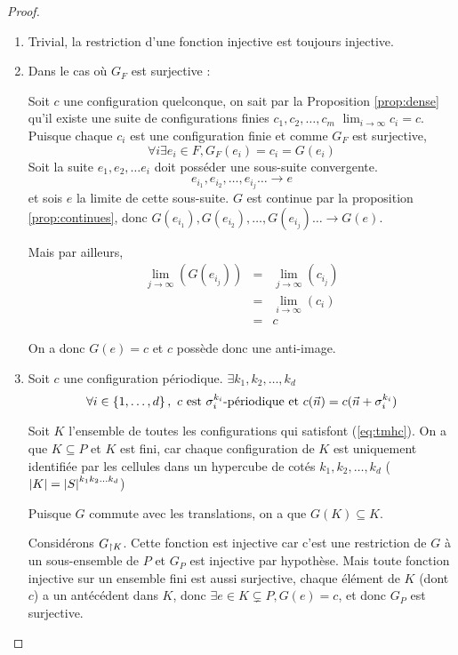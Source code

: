 \begin{proof}
	\begin{enumerate}
		\item Trivial, la restriction d'une fonction injective est toujours injective.
		\item Dans le cas où $G_F$ est surjective :

		      Soit $c$ une configuration quelconque, on sait par la Proposition \ref{prop:dense} qu'il existe
		      une suite de configurations finies $c_1, c_2, \ldots , c_m$ \tlq $\lim_{i \to \infty} c_i = c$.
		      Puisque chaque $c_i$ est une configuration finie et comme $G_F$ est surjective,
		      $$\forall i \exists e_i \in F, G_F(e_i) = c_i = G(e_i)$$
		      Soit la suite $e_1, e_2, \ldots e_i$  doit posséder une sous-suite convergente.
			  $$ e_{i_1}, e_{i_2}, \ldots , e_{i_j} \ldots \to e $$ 
			  et sois $e$ la limite de cette sous-suite.
			  $G$ est continue par la proposition \ref{prop:continues}, donc
		      $G(e_{i_1}), G(e_{i_2}), \ldots , G(e_{i_j}) \ldots  \to G(e)$.

		      Mais par ailleurs,
		      \begin{eqnarray*}
			      \lim_{j \to \infty} (G(e_{i_j})) &=& \lim_{j \to \infty} (c_{i_j}) \\
			      &=& \lim_{i \to \infty} (c_i) \\
			      &=& c
		      \end{eqnarray*}

		      On a donc $G(e) = c$ et $c$ possède donc une anti-image.
		\item Soit $c$ une configuration périodique.
		      $\exists k_1, k_2, \ldots, k_d$ \tlq
		      \begin{equation}
			      \forall i \in \left\{1,\ldots,d\right\}, \ c \text{ est }\sigma_i^{k_i}\text{-périodique} \text{ et }
			      c(\vec n) = c(\vec n + \sigma_i^{k_i})
			      \label{eq:tmhc}
		      \end{equation}

		      Soit $K$ l'ensemble de toutes les configurations qui satisfont (\ref{eq:tmhc}). On a que $K \subseteq P$ et $K$ est fini,
		      car chaque configuration de $K$ est uniquement identifiée par les cellules dans un hypercube de cotés $k_1, k_2, \ldots, k_d$
		      ($\left|K\right| = {\left|S\right|}^{k_1k_2\ldots k_d}$)

		      Puisque $G$ commute avec les translations, on a que $G(K) \subseteq K$.

		      Considérons $G_{\restriction K}$. Cette fonction est injective car c'est une restriction de $G$ à un
		      sous-ensemble de $P$ et $G_P$ est injective par hypothèse.
		      Mais toute fonction injective sur un ensemble fini est aussi surjective,
		      \cad chaque élément de $K$ (dont $c$) a un antécédent dans $K$,
		      donc $\exists e \in K \subsetneq P, G(e) = c$, et donc $G_P$ est surjective.
	\end{enumerate}
\end{proof}

